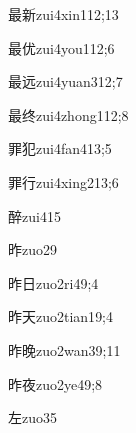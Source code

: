 \begin{verbete}{最新}{zui4xin1}{12;13}
\end{verbete}

\begin{verbete}{最优}{zui4you1}{12;6}
\end{verbete}

\begin{verbete}{最远}{zui4yuan3}{12;7}
\end{verbete}

\begin{verbete}{最终}{zui4zhong1}{12;8}
\end{verbete}

\begin{verbete}{罪犯}{zui4fan4}{13;5}
\end{verbete}

\begin{verbete}{罪行}{zui4xing2}{13;6}
\end{verbete}

\begin{verbete}{醉}{zui4}{15}
\end{verbete}

\begin{verbete}{昨}{zuo2}{9}
\end{verbete}

\begin{verbete}{昨日}{zuo2ri4}{9;4}
\end{verbete}

\begin{verbete}{昨天}{zuo2tian1}{9;4}
\end{verbete}

\begin{verbete}{昨晚}{zuo2wan3}{9;11}
\end{verbete}

\begin{verbete}{昨夜}{zuo2ye4}{9;8}
\end{verbete}

\begin{verbete}{左}{zuo3}{5}
\end{verbete}

